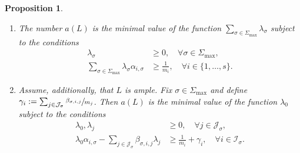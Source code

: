 \documentclass[11pt]{article}
\newcommand{\skpt}{\smallskip}
\numberwithin{equation}{section}
\newenvironment{enumeratei}
{\bgroup\def\theenumi{\roman{enumi}}\def\theenumii{\arabic{enumii}}\begin{enumerate}}
{\end{enumerate}\egroup}
\newcommand{\ii}[1]{\mathcal{J}_{#1}}
\newcommand{\ic}[1]{\mathcal{I}_{#1}}
\newtheorem{proposition}[theorem]{Proposition}
\theoremstyle{definition}
\numberwithin{theorem}{section}
\begin{document}
\skpt
\begin{proposition}
\label{prop:description_a}
\begin{enumeratei}
\item
\label{item:global_a}
The number $a(L)$ is the minimal value of the function
$\sum_{\sigma\in\Sigma_{\max}}\lambda_\sigma$ subject to the conditions
\begin{align}
\label{eq:item:global_a_condition_variables}
\lambda_{\sigma}&\geq0,\quad\forall \sigma\in\Sigma_{\max},\\
\label{eq:item:global_a_condition_effective}
\sum_{\sigma\in\Sigma_{\max}}\lambda_\sigma \alpha_{i,\sigma}
&\geq \frac 1{m_i}, \quad \forall i\in\{1,\dots,s\}.
\end{align}
\item
\label{item:local_a}
Assume, additionally, that $L$ is ample. Fix $\sigma\in\Sigma_{\max}$ and
define $\gamma_i:=\sum_{j\in\ii{\sigma}}\sfrac {\beta_{\sigma,i,j}}{m_j}$.
Then $a(L)$ is the minimal value of the function $\lambda_0$ subject to the conditions
\begin{align}
\label{eq:item:local_a_condition_variables}
\lambda_0, \lambda_j&\geq0, \quad\forall j\in\ii{\sigma},\\
\label{eq:item:local_a_condition_effective}
\lambda_0 \alpha_{i,\sigma} -\sum_{j\in \ii{\sigma}}\beta_{\sigma,i,j}\lambda_j
&\geq \frac 1{m_i}+\gamma_i, \quad \forall i\in\ic{\sigma}.
\end{align}
\end{enumeratei}
\end{proposition}
\end{document}
